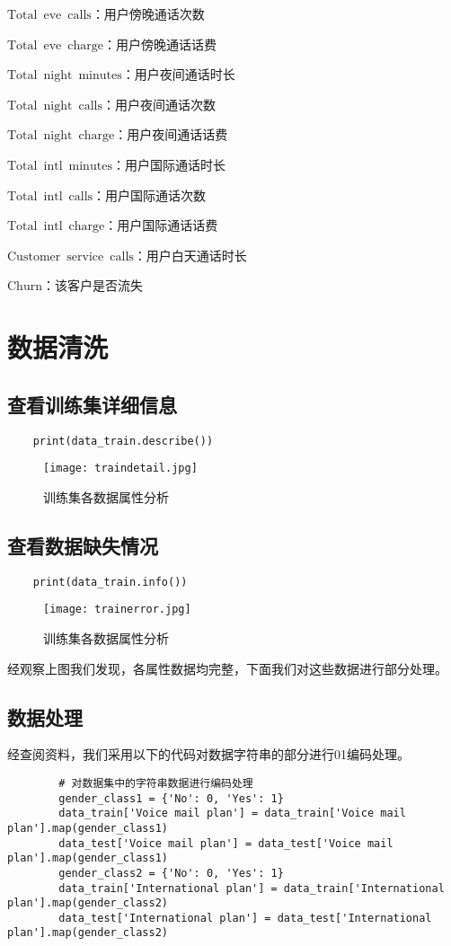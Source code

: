 \documentclass[AutoFakeBold]{LZUThesis}
\begin{document}
$\mathrm{Total\enspace eve\enspace calls}$：用户傍晚通话次数

$\mathrm{Total\enspace eve\enspace charge}$：用户傍晚通话话费

$\mathrm{Total\enspace night\enspace minutes}$：用户夜间通话时长

$\mathrm{Total\enspace night\enspace calls}$：用户夜间通话次数

$\mathrm{Total\enspace night\enspace charge}$：用户夜间通话话费

$\mathrm{Total\enspace intl\enspace minutes}$：用户国际通话时长

$\mathrm{Total\enspace intl\enspace calls}$：用户国际通话次数

$\mathrm{Total\enspace intl\enspace charge}$：用户国际通话话费

$\mathrm{Customer\enspace service\enspace calls}$：用户白天通话时长

$\mathrm{Churn}$：该客户是否流失
\chapter{数据清洗}
\section{查看训练集详细信息}
\begin{lstlisting}
    print(data_train.describe())  
\end{lstlisting}
    \begin{figure}[htbp]
        \centering
        \texttt{[image: traindetail.jpg]}
        \caption{训练集各数据属性分析}
    \end{figure}
\section{查看数据缺失情况}
\begin{lstlisting}
    print(data_train.info())  
\end{lstlisting}
    \begin{figure}[htbp]
        \centering
        \texttt{[image: trainerror.jpg]}
        \caption{训练集各数据属性分析}
    \end{figure}
    经观察上图我们发现，各属性数据均完整，下面我们对这些数据进行部分处理。

    \section{数据处理}
    经查阅资料，我们采用以下的代码对数据字符串的部分进行01编码处理。
    \begin{lstlisting}
        # 对数据集中的字符串数据进行编码处理
        gender_class1 = {'No': 0, 'Yes': 1}
        data_train['Voice mail plan'] = data_train['Voice mail plan'].map(gender_class1)
        data_test['Voice mail plan'] = data_test['Voice mail plan'].map(gender_class1)
        gender_class2 = {'No': 0, 'Yes': 1}
        data_train['International plan'] = data_train['International plan'].map(gender_class2)
        data_test['International plan'] = data_test['International plan'].map(gender_class2)
    \end{lstlisting}
\end{document}
